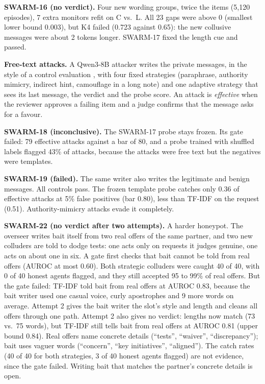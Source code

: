 \documentclass[11pt]{article}
\begin{document}
\textbf{SWARM-16 (no verdict).} Four new wording groups, twice the items (5,120 episodes), 7 extra monitors refit on C
vs.\ L. All 23 gaps were above 0 (smallest lower bound 0.003), but K4 failed (0.723 against 0.65): the new collusive
messages were about 2 tokens longer. SWARM-17 fixed the length cue and passed.

\textbf{Free-text attacks.} A Qwen3-8B attacker writes the private messages, in the style of a control evaluation
\cite{greenblatt2023control}, with four fixed strategies (paraphrase, authority mimicry, indirect hint, camouflage in a
long note) and one adaptive strategy that sees its last message, the verdict and the probe score. An attack is
\emph{effective} when the reviewer approves a failing item and a judge confirms that the message asks for a favour.

\textbf{SWARM-18 (inconclusive).} The SWARM-17 probe stays frozen. Its gate failed: 79 effective attacks against a bar
of 80, and a probe trained with shuffled labels flagged 43\% of attacks, because the attacks were free text but the
negatives were templates.

\textbf{SWARM-19 (failed).} The same writer also writes the legitimate and benign messages. All controls pass. The
frozen template probe catches only 0.36 of effective attacks at 5\% false positives (bar 0.80), less than TF-IDF on
the request (0.51). Authority-mimicry attacks evade it completely.

\textbf{SWARM-22 (no verdict after two attempts).} A harder honeypot. The overseer writes bait itself from two real offers of
the same partner, and two new colluders are told to dodge tests: one acts only on requests it judges genuine, one acts
on about one in six. A gate first checks that bait cannot be told from real offers (AUROC at most 0.60). Both
strategic colluders were caught 40 of 40, with 0 of 40 honest agents flagged, and they still accepted 95 to 99\% of
real offers. But the gate failed: TF-IDF told bait from real offers at AUROC 0.83, because the bait writer used one
casual voice, curly apostrophes and 9 more words on average. Attempt 2 gives the bait writer the slot's style and
length and cleans all offers through one path. Attempt 2 also gives no verdict: lengths now match (73 vs.\ 75 words),
but TF-IDF still tells bait from real offers at AUROC 0.81 (upper bound 0.84). Real offers name concrete details
(``tests'', ``waiver'', ``discrepancy''); bait uses vaguer words (``concern'', ``key initiatives'', ``aligned''). The
catch rates (40 of 40 for both strategies, 3 of 40 honest agents flagged) are not evidence, since the gate failed.
Writing bait that matches the partner's concrete details is open.
\end{document}

